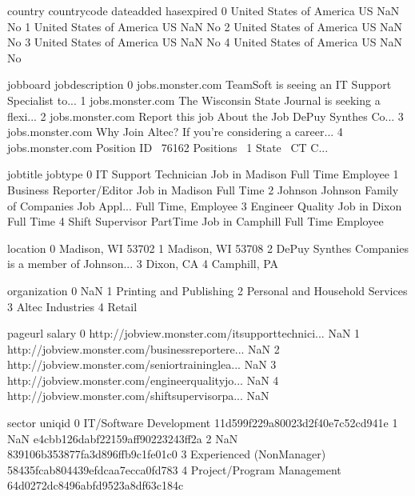 \documentclass[letterpaper,10pt,english]{jupyterBook}
\begin{document}
\begin{sphinxVerbatim}[commandchars=\\\{\}]
                    country country\PYGZus{}code date\PYGZus{}added has\PYGZus{}expired  \PYGZbs{}
0  United States of America           US        NaN          No   
1  United States of America           US        NaN          No   
2  United States of America           US        NaN          No   
3  United States of America           US        NaN          No   
4  United States of America           US        NaN          No   

          job\PYGZus{}board                                    job\PYGZus{}description  \PYGZbs{}
0  jobs.monster.com  TeamSoft is seeing an IT Support Specialist to...   
1  jobs.monster.com  The Wisconsin State Journal is seeking a flexi...   
2  jobs.monster.com  Report this job About the Job DePuy Synthes Co...   
3  jobs.monster.com  Why Join Altec? If you’re considering a career...   
4  jobs.monster.com  Position ID\PYGZsh{}  76162 \PYGZsh{} Positions  1 State  CT C...   

                                           job\PYGZus{}title             job\PYGZus{}type  \PYGZbs{}
0               IT Support Technician Job in Madison   Full Time Employee   
1            Business Reporter/Editor Job in Madison            Full Time   
2  Johnson \PYGZam{} Johnson Family of Companies Job Appl...  Full Time, Employee   
3                    Engineer \PYGZhy{} Quality Job in Dixon            Full Time   
4       Shift Supervisor \PYGZhy{} Part\PYGZhy{}Time Job in Camphill   Full Time Employee   

                                            location  \PYGZbs{}
0                                  Madison, WI 53702   
1                                  Madison, WI 53708   
2  DePuy Synthes Companies is a member of Johnson...   
3                                          Dixon, CA   
4                                       Camphill, PA   

                      organization  \PYGZbs{}
0                              NaN   
1          Printing and Publishing   
2  Personal and Household Services   
3                 Altec Industries   
4                           Retail   

                                            page\PYGZus{}url salary  \PYGZbs{}
0  http://jobview.monster.com/it\PYGZhy{}support\PYGZhy{}technici...    NaN   
1  http://jobview.monster.com/business\PYGZhy{}reporter\PYGZhy{}e...    NaN   
2  http://jobview.monster.com/senior\PYGZhy{}training\PYGZhy{}lea...    NaN   
3  http://jobview.monster.com/engineer\PYGZhy{}quality\PYGZhy{}jo...    NaN   
4  http://jobview.monster.com/shift\PYGZhy{}supervisor\PYGZhy{}pa...    NaN   

                       sector                           uniq\PYGZus{}id  
0     IT/Software Development  11d599f229a80023d2f40e7c52cd941e  
1                         NaN  e4cbb126dabf22159aff90223243ff2a  
2                         NaN  839106b353877fa3d896ffb9c1fe01c0  
3   Experienced (Non\PYGZhy{}Manager)  58435fcab804439efdcaa7ecca0fd783  
4  Project/Program Management  64d0272dc8496abfd9523a8df63c184c  
\end{sphinxVerbatim}
\end{document}
